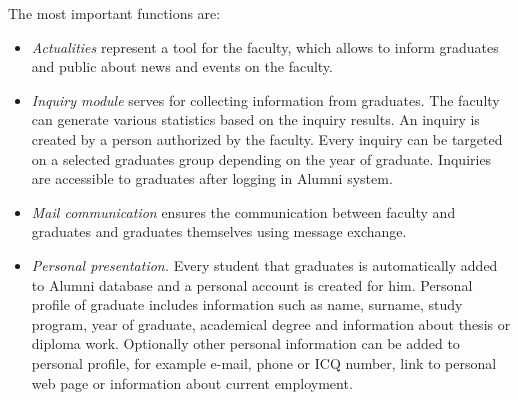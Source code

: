 \documentclass{iitsrc}[2006/14/02]
\begin{document}
The most important functions are:
\begin{itemize}

\item {\em Actualities} 
represent a tool for the faculty, which allows to inform graduates and public about news and events on the faculty.

\item {\em Inquiry module}
serves for collecting information from graduates. The faculty can generate various statistics based on the inquiry results. An inquiry is created by a person authorized by the faculty. Every inquiry can be targeted on a selected graduates group depending on the year of graduate. Inquiries are accessible to graduates after logging in Alumni system.

\item {\em Mail communication} ensures the communication between faculty and graduates and graduates themselves using message exchange.

\item {\em Personal presentation.}
Every student that graduates is automatically added to Alumni database and a personal account is created for him. Personal profile of graduate includes information such as name, surname, study program, year of graduate, academical degree and information about thesis or diploma work. Optionally other personal information can be added to personal profile, for example e-mail, phone or ICQ number, link to personal web page or information about current employment. 


\end{itemize}
\end{document}
